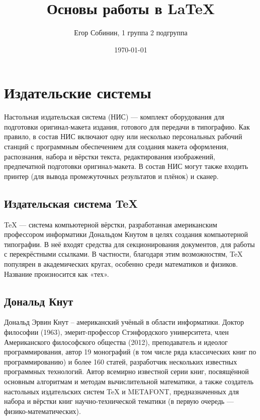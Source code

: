 \documentclass[a4paper,12pt]{article} %
\author{Егор Собинин, 1 группа 2 подгруппа}
\title{Основы работы в \LaTeX{}}
\date{\today}
\begin{document}

\maketitle
\newpage


\section{Издательские системы}
\hspace{15mm}Настольная издательская система (НИС) — комплект оборудования для подготовки оригинал-макета издания, готового для передачи в типографию.
Как правило, в состав НИС включают одну или несколько персональных рабочий станций с программным обеспечением для создания макета оформления, распознания, набора и вёрстки текста, редактирования изображений, предпечатной подготовки оригинал-макета. В состав НИС могут также входить принтер (для вывода промежуточных результатов и плёнок) и сканер.
\subsection{Издательская система TeX}
\hspace{15mm}TeX — система компьютерной вёрстки, разработанная американским профессором информатики Дональдом Кнутом в целях создания компьютерной типографии. В неё входят средства для секционирования документов, для работы с перекрёстными ссылками. В частности, благодаря этим возможностям, TeX популярен в академических кругах, особенно среди математиков и физиков. Название произносится как «тех».
\subsection{Дональд Кнут}
\hspace{15mm}Дональд Эрвин Кнут -- американский учёный в области информатики.
Доктор философии (1963), эмерит-профессор Стэнфордского университета, член Американского философского общества (2012), преподаватель и идеолог программирования, автор 19 монографий (в том числе ряда классических книг по программированию) и более 160 статей, разработчик нескольких известных программных технологий. Автор всемирно известной серии книг, посвящённой основным алгоритмам и методам вычислительной математики, а также создатель настольных издательских систем TeX и METAFONT, предназначенных для набора и вёрстки книг научно-технической тематики (в первую очередь — физико-математических).
\end{document}
